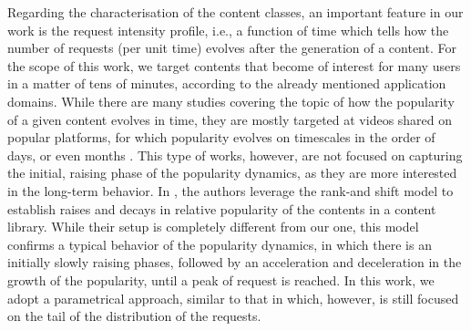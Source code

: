 Regarding the characterisation of the content classes, an important
feature in our work is the request intensity profile, i.e., a function
of time which tells how the number of requests (per unit time) evolves
after the generation of a content. For the scope of this work, we
target contents that become of interest for many users in a matter
of tens of minutes, according to the already mentioned application
domains. While there are many studies covering the topic of how the
popularity of a given content evolves in time, they are mostly targeted
at videos shared on popular platforms, for which popularity evolves
on timescales in the order of days, or even months \cite{Korosi2011,Garroppo2018}.
This type of works, however, are not focused on capturing the initial,
raising phase of the popularity dynamics, as they are more interested
in the long-term behavior. In \cite{Mangili2016}, the authors leverage
the rank-and shift model to establish raises and decays in relative
popularity of the contents in a content library. While their setup
is completely different from our one, this model confirms a typical
behavior of the popularity dynamics, in which there is an initially
slowly raising phases, followed by an acceleration and deceleration
in the growth of the popularity, until a peak of request is reached.
In this work, we adopt a parametrical approach, similar to that in
\cite{Avramova2009} which, however, is still focused on the tail
of the distribution of the requests.